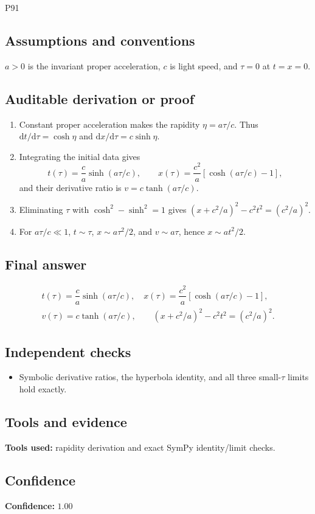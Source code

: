 \documentclass[11pt]{article}
\newcommand{\dd}{\mathrm{d}}
\begin{document}
\begin{mprsolution}{P91}
\subsection*{Assumptions and conventions}
\(a>0\) is the invariant proper acceleration, \(c\) is light speed, and
\(\tau=0\) at \(t=x=0\).
\subsection*{Auditable derivation or proof}
\begin{enumerate}[label=\textbf{Step \arabic*:},leftmargin=*]
\item Constant proper acceleration makes the rapidity
\(\eta=a\tau/c\).  Thus \(\dd t/\dd\tau=\cosh\eta\) and
\(\dd x/\dd\tau=c\sinh\eta\).
\item Integrating the initial data gives
\[
t(\tau)=\frac ca\sinh(a\tau/c),\qquad
x(\tau)=\frac{c^2}{a}[\cosh(a\tau/c)-1],
\]
and their derivative ratio is \(v=c\tanh(a\tau/c)\).
\item Eliminating \(\tau\) with \(\cosh^2-\sinh^2=1\) gives
\((x+c^2/a)^2-c^2t^2=(c^2/a)^2\).
\item For \(a\tau/c\ll1\), \(t\sim\tau\), \(x\sim a\tau^2/2\), and
\(v\sim a\tau\), hence \(x\sim at^2/2\).
\end{enumerate}
\subsection*{Final answer}
\[
\boxed{\begin{gathered}
t(\tau)=\dfrac ca\sinh(a\tau/c),\quad
x(\tau)=\dfrac{c^2}{a}[\cosh(a\tau/c)-1],\\
v(\tau)=c\tanh(a\tau/c),\qquad
(x+c^2/a)^2-c^2t^2=(c^2/a)^2.
\end{gathered}}
\]
\subsection*{Independent checks}
\begin{itemize}[leftmargin=*]
\item Symbolic derivative ratios, the hyperbola identity, and all three
small-\(\tau\) limits hold exactly.
\end{itemize}
\subsection*{Tools and evidence}
\textbf{Tools used:} rapidity derivation and exact SymPy identity/limit checks.
\subsection*{Confidence}
\textbf{Confidence:} \(1.00\)
\end{mprsolution}
\end{document}
